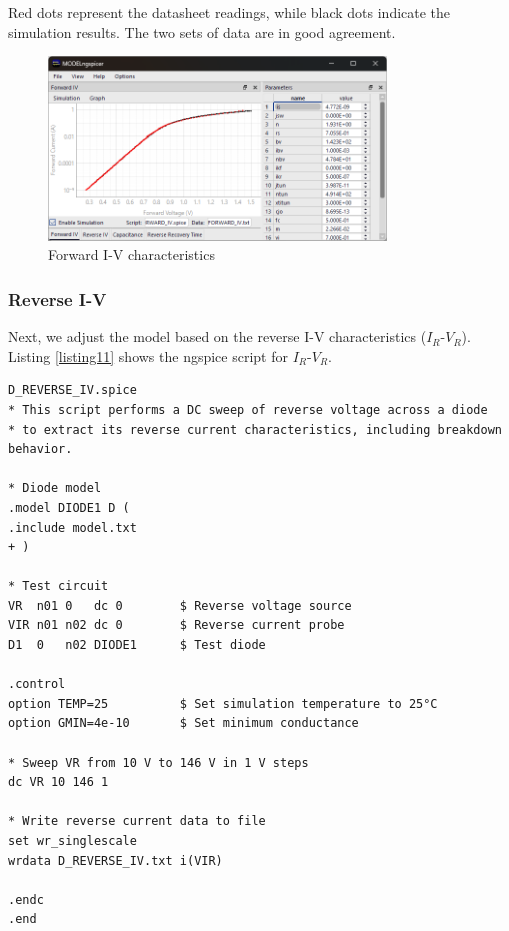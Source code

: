 \documentclass[a4paper,12pt,titlepage]{article}
\begin{document}
Red dots represent the datasheet readings, while black dots indicate the simulation results.
The two sets of data are in good agreement.

\begin{figure}[htbp]
    \centering
    \includegraphics[width=0.8\textwidth]{images/img04.png}
    \caption{Forward I-V characteristics}
    \label{fig:img04}
\end{figure}

\pagebreak

\subsubsection{Reverse I-V}

Next, we adjust the model based on the reverse I-V characteristics ($I_R$-$V_R$).
Listing \ref{listing11} shows the ngspice script for $I_R$-$V_R$.

\begin{lstlisting}[label=listing11,caption=D\_REVERSE\_IV.spice]
D_REVERSE_IV.spice
* This script performs a DC sweep of reverse voltage across a diode
* to extract its reverse current characteristics, including breakdown behavior.

* Diode model
.model DIODE1 D (
.include model.txt
+ )

* Test circuit
VR  n01 0   dc 0        $ Reverse voltage source
VIR n01 n02 dc 0        $ Reverse current probe
D1  0   n02 DIODE1      $ Test diode

.control
option TEMP=25          $ Set simulation temperature to 25°C
option GMIN=4e-10       $ Set minimum conductance

* Sweep VR from 10 V to 146 V in 1 V steps
dc VR 10 146 1

* Write reverse current data to file
set wr_singlescale
wrdata D_REVERSE_IV.txt i(VIR)

.endc
.end
\end{lstlisting}
\end{document}
